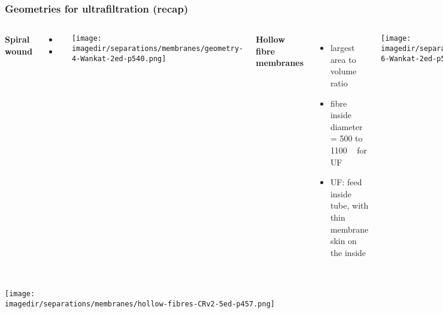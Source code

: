 \begin{frame}\frametitle{Geometries for ultrafiltration (recap)}
	\begin{columns}[t]
			\textbf{Spiral wound}
			
				\begin{itemize}
					\item	\iftoggle{instructor}{high surface area per unit volume}{}
					\item	\iftoggle{instructor}{high turbulence, reducing mass transfer resistance}{}
				\end{itemize} 
			\vfill
			\begin{center}
				\texttt{[image: \\imagedir/separations/membranes/geometry-4-Wankat-2ed-p540.png]}
			\end{center}
			\textbf{Hollow fibre membranes}
			\begin{itemize}
				\item	largest area to volume ratio
				\item	fibre inside diameter = 500 to 1100 \micron~ for UF
				\item	UF: feed inside tube, with thin membrane skin on the inside 
			\end{itemize}
			\begin{center}
				\texttt{[image: \\imagedir/separations/membranes/geometry-6-Wankat-2ed-p540.png]}
			\end{center}
	\end{columns}	
\end{frame}

\begin{frame}\frametitle{}
	\begin{center}
		\texttt{[image: \\imagedir/separations/membranes/hollow-fibres-CRv2-5ed-p457.png]}
	\end{center}
\end{frame}

